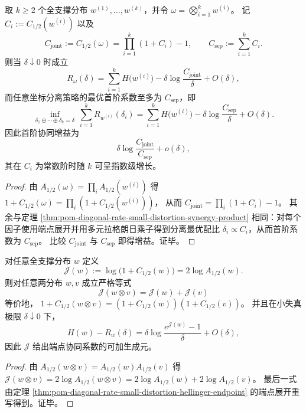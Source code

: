 \begin{theorem}\label{thm:pom-diagonal-rate-small-distortion-synergy-k}
取 \(k\ge 2\) 个全支撑分布 \(w^{(1)},\dots,w^{(k)}\)，并令 \(\omega=\bigotimes_{i=1}^k w^{(i)}\)。
记 \(C_i:=C_{1/2}(w^{(i)})\) 以及
\[
C_{\mathrm{joint}}:=C_{1/2}(\omega)=\prod_{i=1}^k(1+C_i)-1,\qquad
C_{\mathrm{sep}}:=\sum_{i=1}^k C_i.
\]
则当 \(\delta\downarrow 0\) 时成立
\[
R_{\omega}(\delta)=\sum_{i=1}^k H\!\bigl(w^{(i)}\bigr)-\delta\log\frac{C_{\mathrm{joint}}}{\delta}+O(\delta),
\]
而任意坐标分离策略的最优首阶系数至多为 \(C_{\mathrm{sep}}\)，即
\[
\inf_{\delta_1\oplus\cdots\oplus\delta_k=\delta}\ \sum_{i=1}^k R_{w^{(i)}}(\delta_i)
=\sum_{i=1}^k H\!\bigl(w^{(i)}\bigr)-\delta\log\frac{C_{\mathrm{sep}}}{\delta}+O(\delta).
\]
因此首阶协同增益为
\[
\delta\log\frac{C_{\mathrm{joint}}}{C_{\mathrm{sep}}}+o(\delta),
\]
其在 \(C_i\) 为常数阶时随 \(k\) 可呈指数级增长。
\end{theorem}
\begin{proof}
由 \(A_{1/2}(\omega)=\prod_i A_{1/2}(w^{(i)})\) 得
\(
1+C_{1/2}(\omega)=\prod_i (1+C_{1/2}(w^{(i)}))
\)，
从而 \(C_{\mathrm{joint}}=\prod_i(1+C_i)-1\)。
其余与定理 \ref{thm:pom-diagonal-rate-small-distortion-synergy-product} 相同：对每个因子使用端点展开并用多元拉格朗日乘子得到分离最优配比 \(\delta_i\propto C_i\)，从而首阶系数为 \(C_{\mathrm{sep}}\)。
比较 \(C_{\mathrm{joint}}\) 与 \(C_{\mathrm{sep}}\) 即得增益。证毕。
\end{proof}

\begin{corollary}[端点协同生成元的张量同态]\label{cor:pom-diagonal-rate-small-distortion-synergy-generator-homomorphism}
对任意全支撑分布 \(w\) 定义
\[
\mathcal J(w):=\log\bigl(1+C_{1/2}(w)\bigr)=2\log A_{1/2}(w).
\]
则对任意两分布 \(w,v\) 成立严格等式
\[
\boxed{\;
\mathcal J(w\otimes v)=\mathcal J(w)+\mathcal J(v)\;}
\]
等价地，
\(
1+C_{1/2}(w\otimes v)=(1+C_{1/2}(w))(1+C_{1/2}(v))
\)。
并且在小失真极限 \(\delta\downarrow 0\) 下，
\[
H(w)-R_w(\delta)=\delta\log\frac{e^{\mathcal J(w)}-1}{\delta}+O(\delta),
\]
因此 \(\mathcal J\) 给出端点协同系数的可加生成元。
\end{corollary}
\begin{proof}
由 \(A_{1/2}(w\otimes v)=A_{1/2}(w)A_{1/2}(v)\) 得
\(
\mathcal J(w\otimes v)=2\log A_{1/2}(w\otimes v)=2\log A_{1/2}(w)+2\log A_{1/2}(v)
\)。
最后一式由定理 \ref{thm:pom-diagonal-rate-small-distortion-hellinger-endpoint} 的端点展开重写得到。证毕。
\end{proof}
